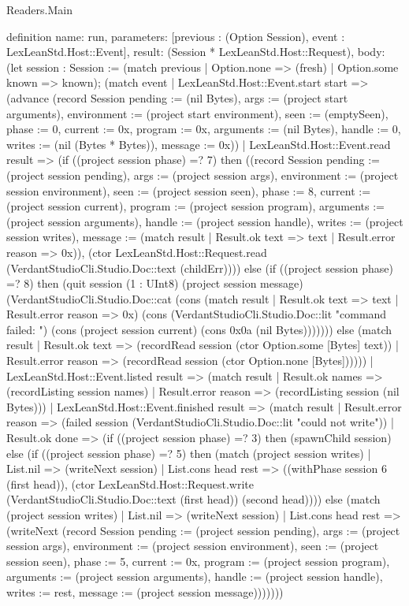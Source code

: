 \begin{lexlean}{Readers.Main}
\begin{semanticmodule}
definition{
  name: run,
  parameters: [previous : (Option Session), event : LexLeanStd.Host::Event],
  result: (Session * LexLeanStd.Host::Request),
  body: (let session : Session := (match previous
      | Option.none => (fresh)
      | Option.some known => known); (match event
    | LexLeanStd.Host::Event.start start => (advance (record Session {pending := (nil Bytes), args := (project start arguments), environment := (project start environment), seen := (emptySeen), phase := 0, current := 0x, program := 0x, arguments := (nil Bytes), handle := 0, writes := (nil (Bytes * Bytes)), message := 0x}))
    | LexLeanStd.Host::Event.read result => (if ((project session phase) =? 7) then ((record Session {pending := (project session pending), args := (project session args), environment := (project session environment), seen := (project session seen), phase := 8, current := (project session current), program := (project session program), arguments := (project session arguments), handle := (project session handle), writes := (project session writes), message := (match result
        | Result.ok text => text
        | Result.error reason => 0x)}), (ctor LexLeanStd.Host::Request.read (VerdantStudioCli.Studio.Doc::text (childErr)))) else (if ((project session phase) =? 8) then (quit session (1 : UInt8) (project session message) (VerdantStudioCli.Studio.Doc::cat (cons (match result
        | Result.ok text => text
        | Result.error reason => 0x) (cons (VerdantStudioCli.Studio.Doc::lit "command failed: ") (cons (project session current) (cons 0x0a (nil Bytes))))))) else (match result
        | Result.ok text => (recordRead session (ctor Option.some [Bytes] text))
        | Result.error reason => (recordRead session (ctor Option.none [Bytes])))))
    | LexLeanStd.Host::Event.listed result => (match result
      | Result.ok names => (recordListing session names)
      | Result.error reason => (recordListing session (nil Bytes)))
    | LexLeanStd.Host::Event.finished result => (match result
      | Result.error reason => (failed session (VerdantStudioCli.Studio.Doc::lit "could not write"))
      | Result.ok done => (if ((project session phase) =? 3) then (spawnChild session) else (if ((project session phase) =? 5) then (match (project session writes)
          | List.nil => (writeNext session)
          | List.cons head rest => ((withPhase session 6 (first head)), (ctor LexLeanStd.Host::Request.write (VerdantStudioCli.Studio.Doc::text (first head)) (second head)))) else (match (project session writes)
          | List.nil => (writeNext session)
          | List.cons head rest => (writeNext (record Session {pending := (project session pending), args := (project session args), environment := (project session environment), seen := (project session seen), phase := 5, current := 0x, program := (project session program), arguments := (project session arguments), handle := (project session handle), writes := rest, message := (project session message)}))))))
}
\end{semanticmodule}
\end{lexlean}
